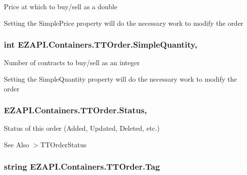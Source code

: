 Price at which to buy/sell as a double 

Setting the Simple\-Price property will do the necessary work to modify the order\hypertarget{class_e_z_a_p_i_1_1_containers_1_1_t_t_order_af0938ed68ec7972dabe4cc4bd89b9c6b}{
\subsubsection[{Simple\-Quantity}]{\setlength{\rightskip}{0pt plus 5cm}int E\-Z\-A\-P\-I.\-Containers.\-T\-T\-Order.\-Simple\-Quantity\hspace{0.3cm}{\ttfamily [get]}, {\ttfamily [set]}}}\label{class_e_z_a_p_i_1_1_containers_1_1_t_t_order_af0938ed68ec7972dabe4cc4bd89b9c6b}


Number of contracts to buy/sell as an integer 

Setting the Simple\-Quantity property will do the necessary work to modify the order\hypertarget{class_e_z_a_p_i_1_1_containers_1_1_t_t_order_af67181ef5bafdbac8d2e49df4a106a43}{
\subsubsection[{Status}]{ E\-Z\-A\-P\-I.\-Containers.\-T\-T\-Order.\-Status\hspace{0.3cm}{\ttfamily [get]}, {\ttfamily [set]}}}\label{class_e_z_a_p_i_1_1_containers_1_1_t_t_order_af67181ef5bafdbac8d2e49df4a106a43}


Status of this order (Added, Updated, Deleted, etc.) 

\begin{DoxySeeAlso}{See Also}
$>$\-T\-T\-Order\-Status


\end{DoxySeeAlso}
\hypertarget{class_e_z_a_p_i_1_1_containers_1_1_t_t_order_ad4d05ca4464eddb49824743cae497e69}{
\subsubsection[{Tag}]{\setlength{\rightskip}{0pt plus 5cm}string E\-Z\-A\-P\-I.\-Containers.\-T\-T\-Order.\-Tag\hspace{0.3cm}{\ttfamily [get]}}}\label{class_e_z_a_p_i_1_1_containers_1_1_t_t_order_ad4d05ca4464eddb49824743cae497e69}


